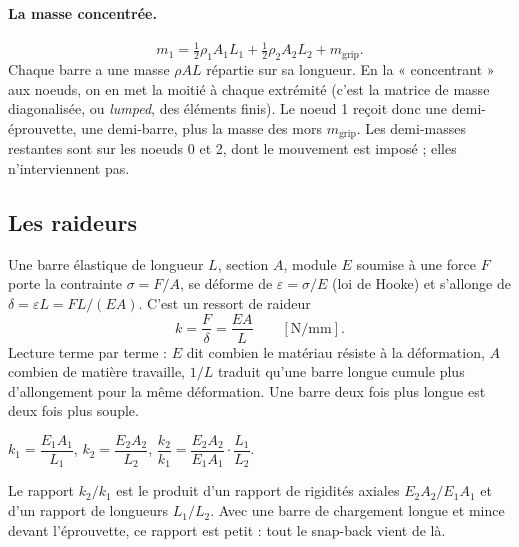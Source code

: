 \documentclass[11pt,a4paper]{article}
\begin{document}
\paragraph{La masse concentrée.}
\begin{equation}
  m_1 = \tfrac12\rho_1A_1L_1 + \tfrac12\rho_2A_2L_2 + m_{\text{grip}} .
\end{equation}
Chaque barre a une masse $\rho AL$ répartie sur sa longueur. En la « concentrant » aux noeuds,
on en met la moitié à chaque extrémité (c'est la matrice de masse diagonalisée, ou \emph{lumped},
des éléments finis). Le noeud 1 reçoit donc une demi-éprouvette, une demi-barre, plus la masse
des mors $m_{\text{grip}}$. Les demi-masses restantes sont sur les noeuds 0 et 2, dont le
mouvement est imposé ; elles n'interviennent pas.

\subsection{Les raideurs}
Une barre élastique de longueur $L$, section $A$, module $E$ soumise à une force $F$ porte la
contrainte $\sigma = F/A$, se déforme de $\varepsilon = \sigma/E$ (loi de Hooke) et s'allonge de
$\delta = \varepsilon L = FL/(EA)$. C'est un ressort de raideur
\begin{equation}
  k = \frac{F}{\delta} = \frac{EA}{L}\qquad[\text{N/mm}].
\end{equation}
Lecture terme par terme : $E$ dit combien le matériau résiste à la déformation, $A$ combien de
matière travaille, $1/L$ traduit qu'une barre longue cumule plus d'allongement pour la même
déformation. Une barre deux fois plus longue est deux fois plus souple.
\begin{alamain}
$k_1 = \dfrac{E_1A_1}{L_1}$, \qquad $k_2 = \dfrac{E_2A_2}{L_2}$, \qquad
$\dfrac{k_2}{k_1} = \dfrac{E_2A_2}{E_1A_1}\cdot\dfrac{L_1}{L_2}$.
\end{alamain}
Le rapport $k_2/k_1$ est le produit d'un rapport de rigidités axiales $E_2A_2/E_1A_1$ et d'un
rapport de longueurs $L_1/L_2$. Avec une barre de chargement longue et mince devant
l'éprouvette, ce rapport est petit : tout le snap-back vient de là.
\end{document}
